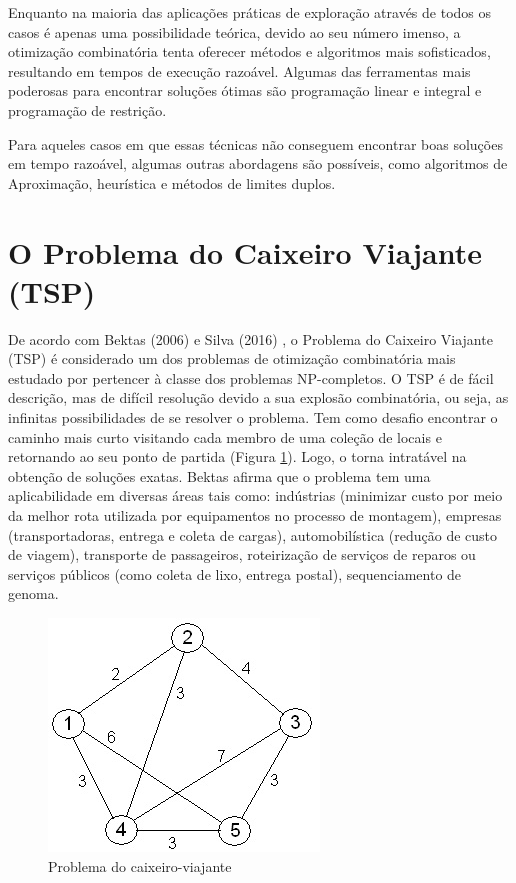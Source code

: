 Enquanto na maioria das aplicações práticas de exploração através de todos os casos é apenas uma possibilidade teórica, devido ao seu número imenso, a otimização combinatória tenta oferecer métodos e algoritmos mais sofisticados, resultando em tempos de execução razoável. Algumas das ferramentas mais poderosas para encontrar soluções ótimas são programação linear e integral e programação de restrição.

Para aqueles casos em que essas técnicas não conseguem encontrar boas soluções em tempo razoável, algumas outras abordagens são possíveis, como algoritmos de Aproximação, heurística e métodos de limites duplos.

\section{O Problema do Caixeiro Viajante (TSP)}
\label{sec-tsp}

De acordo com Bektas (2006) \cite{bektas2006multiple} e Silva (2016) \cite{silva2016algoritmo}, o Problema do Caixeiro Viajante (TSP) é considerado um dos problemas de otimização combinatória mais estudado por pertencer à classe dos problemas NP-completos. O TSP é de fácil descrição, mas de difícil resolução devido a sua explosão combinatória, ou seja, as infinitas possibilidades de se resolver o problema. Tem como desafio encontrar o caminho mais curto visitando cada membro de uma coleção de locais e retornando ao seu ponto de partida (Figura \ref{fig:tsp-sample}). Logo, o torna intratável na obtenção de soluções exatas. Bektas afirma que o problema tem uma aplicabilidade em diversas áreas tais como: indústrias (minimizar custo por meio da melhor rota utilizada por equipamentos no processo de montagem), empresas (transportadoras, entrega e coleta de cargas), automobilística (redução de custo de viagem), transporte de passageiros, roteirização de serviços de reparos ou serviços públicos (como coleta de lixo, entrega postal), sequenciamento de genoma.

\begin{figure}[h]
	\caption{\label{fig:tsp-sample}Problema do caixeiro-viajante}
	\begin{center}
	    \includegraphics[scale=0.5]{imagens/tsp-sample.jpg}
	\end{center}
\end{figure}


